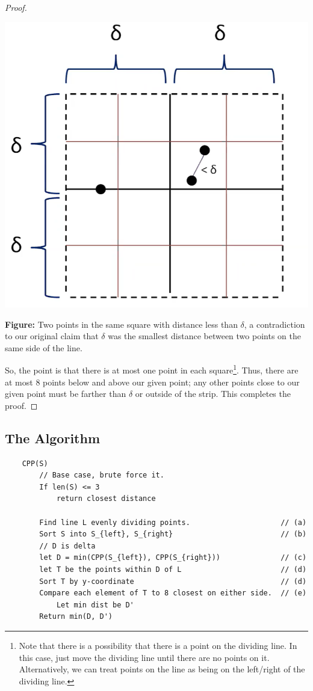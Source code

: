 \documentclass[letterpaper]{article}
\begin{document}
\begin{mdframed}[]
\begin{proof}
\begin{center}
            \includegraphics[scale=0.37]{../assets/closest_proof_4.png}

            \textbf{Figure:} Two points in the same square with distance less than $\delta$, a contradiction to our original claim that $\delta$ was the smallest distance between two points on the same side of the line. 
        \end{center}
        
        So, the point is that there is at most one point in each square\footnote{Note that there is a possibility that there is a point on the dividing line. In this case, just move the dividing line until there are no points on it. Alternatively, we can treat points on the line as being on the left/right of the dividing line.}. Thus, there are at most 8 points below and above our given point; any other points close to our given point must be farther than $\delta$ or outside of the strip. This completes the proof. 
    \end{proof}
\end{mdframed}

\subsection{The Algorithm}
\begin{verbatim}
    CPP(S)
        // Base case, brute force it. 
        If len(S) <= 3
            return closest distance 
        
        Find line L evenly dividing points.                     // (a)
        Sort S into S_{left}, S_{right}                         // (b)
        // D is delta 
        let D = min(CPP(S_{left}), CPP(S_{right}))              // (c)
        let T be the points within D of L                       // (d)
        Sort T by y-coordinate                                  // (d)
        Compare each element of T to 8 closest on either side.  // (e)
            Let min dist be D' 
        Return min(D, D')
\end{verbatim}
\end{document}
